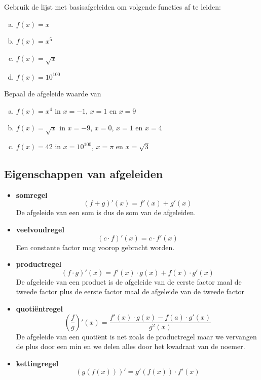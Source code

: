 \documentclass[a4paper,12pt,twoside]{article}
\newenvironment{kader}{
  \begin{mdframed}[nobreak=true]
  }{%
  \end{mdframed}
}
\begin{document}
\begin{oefening}
Gebruik de lijst met basisafgeleiden om volgende functies af te leiden:
\begin{enumerate}[(a)]
  \itemsep.5em
  \item $f(x)=x$
  \item $f(x)=x^5$
  \item $f(x)=\sqrt{x}$
  \item $f(x)=10^{100}$
\end{enumerate}
\end{oefening}

\begin{oefening}
Bepaal de afgeleide waarde van
\begin{enumerate}[(a)]
  \itemsep.5em
  \item $f(x)=x^4$ in $x=-1$, $x=1$ en $x=9$
  \item $f(x)=\sqrt{x}$ in $x=-9$, $x=0$, $x=1$ en $x=4$
  \item $f(x)=42$ in $x=10^{100}$, $x=\pi$ en $x=\sqrt{3}$
\end{enumerate}
\end{oefening}

\subsection{Eigenschappen van afgeleiden}

\begin{kader}
  \begin{itemize}
  \item {\bf somregel}
    $$(f+g)'(x)=f'(x)+g'(x)$$
    De afgeleide van een som is dus de som van de afgeleiden.
  \item {\bf veelvoudregel}
    $$(c\cdot f)'(x) = c\cdot f'(x)$$
    Een constante factor mag voorop gebracht worden.
  \item {\bf productregel}
    $$(f\cdot g)'(x)=f'(x)\cdot g(x) + f(x)\cdot g'(x)$$
    De afgeleide van een product is de afgeleide van de eerste factor maal de tweede factor plus de eerste factor maal de afgeleide van de tweede factor
  \item {\bf quotiëntregel}
    $$\left(\dfrac{f}{g}\right)'(x)=\dfrac{f'(x)\cdot g(x)-f(a)\cdot g'(x)}{g^2(x)}$$
    De afgeleide van een quotiënt is net zoals de productregel maar we vervangen de plus door een min en we delen alles door het kwadraat van de noemer.
  \item {\bf kettingregel}
    $$\left(g\left(f\left(x\right)\right)\right)'=g'(f(x))\cdot f'(x)$$
  \end{itemize}
\end{kader}
\end{document}
